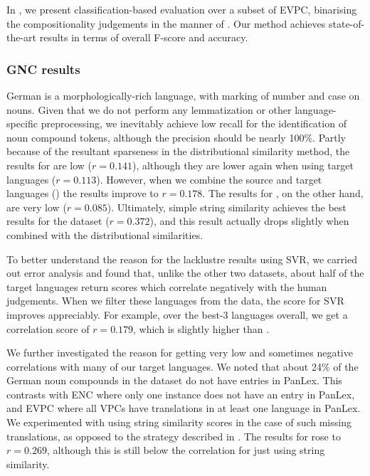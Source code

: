 \documentclass[output=paper
,modfonts
,nonflat]{langsci/langscibook}
\begin{document}
In , we present classification-based evaluation
over a subset of EVPC, binarising the compositionality judgements in the
manner of \citet{bannard2003}. Our method achieves state-of-the-art
results in terms of overall F-score and accuracy.



\subsubsection{GNC results}

German is a morphologically-rich language, with marking of number and
case on nouns. Given that we do not perform any lemmatization or other
language-specific preprocessing, we inevitably achieve low recall for
the identification of noun compound tokens, although the precision
should be nearly 100\%. Partly because of the resultant sparseness in
the distributional similarity method, the results for \CSsource are
low ($r = 0.141$), although they are lower again when using target
languages ($r = 0.113$). However, when we combine the source and
target languages (\CSsourcetarg) the results improve to $r =
0.178$. The results for \CSsvr, on the other hand, are very low ($r =
0.085$). Ultimately, simple string similarity achieves the best
results for the dataset ($r = 0.372$), and this result actually drops
slightly when combined with the distributional similarities.

To better understand the reason for the lacklustre results using SVR, we
carried out error analysis and found that, unlike the other two
datasets, about half of the target languages return scores which
correlate negatively with the human judgements. When we filter these
languages from the data, the score for SVR improves appreciably. For
example, over the best-3 languages overall, we get a correlation score
of $r = 0.179$, which is slightly higher than \CSsourcetarg.

We further investigated the reason for getting very low and sometimes
negative correlations with many of our target languages. We noted that
about 24\% of the German noun compounds in the dataset do not have
entries in PanLex. This contrasts with ENC where only one instance
does not have an entry in PanLex, and EVPC where all VPCs have
translations in at least one language in PanLex. We experimented with
using string similarity scores in the case of such missing
translations, as opposed to the strategy described in
. The results for \CSsvr rose to $r =
0.269$, although this is still below the correlation for just using
string similarity.
\end{document}
